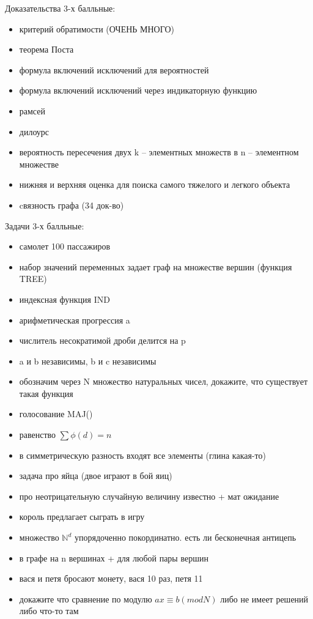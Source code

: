\documentclass[a4paper,12pt]{article}
\author{Бурмашев Григорий, БПМИ-208}
\title{}
\date{\today}
\begin{document}
Доказательства 3-х балльные:
\begin{itemize}
\item
критерий обратимости (ОЧЕНЬ МНОГО)
\item
теорема Поста
\item
формула включений исключений для вероятностей
\item
формула включений исключений через индикаторную функцию
\item
рамсей
\item
дилоурс
\item
вероятность пересечения двух k -- элементных множеств в n -- элементном множестве
\item нижняя и верхняя оценка для поиска самого тяжелого и легкого объекта
\item cвязность графа (34 док-во)
\end{itemize}
Задачи 3-х балльные:
\begin{itemize}
\item самолет  100 пассажиров
\item набор значений переменных задает граф на множестве вершин (функция TREE)
\item индексная функция IND
\item арифметическая прогрессия a
\item числитель несократимой дроби делится на p
\item a и b независимы, b и c независимы
\item обозначим через N множество  натуральных чисел, докажите, что существует такая функция
\item голосование MAJ()
\item равенство $\sum \phi(d) = n$
\item в симметрическую разность входят все элементы (глина какая-то)
\item задача про яйца (двое играют в бой яиц)
\item про неотрицательную случайную величину известно + мат ожидание
\item король предлагает сыграть в игру
\item множество $\mathbb{N}^d$ упорядоченно покординатно. есть ли бесконечная антицепь
\item в графе на n вершинах + для любой пары вершин
\item вася и петя бросают монету, вася 10 раз, петя 11
\item докажите что сравнение по модулю $ax \equiv b (mod N)$ либо не имеет решений либо что-то там
\end{itemize}
\end{document}
